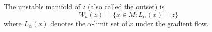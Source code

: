 The unstable manifold of $z$ (also called the outset) is
$$W_u(z) = \{x \in M : L_\alpha(x) = z\}$$
where $L_\alpha(x)$ denotes the $\alpha$-limit set of $x$ under the gradient flow.
